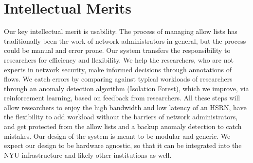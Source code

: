 \section{Intellectual Merits}

Our key intellectual merit is usability. The process of managing allow lists has traditionally been the work of network administrators in general, but the process could be manual and error prone. Our system transfers the responsibility to researchers for efficiency and flexibility. We help the researchers, who are not experts in network security, make informed decisions through annotations of flows. We catch errors by comparing against typical workloads of researchers through an anomaly detection algorithm (Isolation Forest), which we improve, via reinforcement learning, based on feedback from researchers. All these steps will allow researchers to enjoy the high bandwidth and low latency of an HSRN, have the flexibility to add workload without the barriers of network administrators, and get protected from the allow lists and a backup anomaly detection to catch mistakes. Our design of the system is meant to be modular and generic. We expect our design to be hardware agnostic, so that it can be integrated into the NYU infrastructure and likely other institutions as well.
